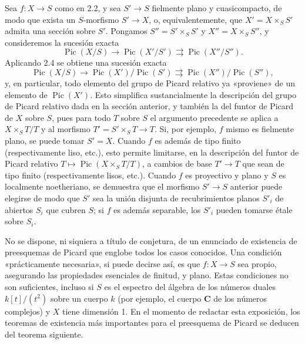  Sea $f:X\longrightarrow S$ como en 2.2, y sea
$S'\longrightarrow S$ fielmente plano y cuasicompacto, de modo que exista un
$S$-morfismo $S'\longrightarrow X$, o, equivalentemente, que
$X'=X\times_SS'$ admita una sección sobre $S'$. Pongamos
$S''=S'\times_SS'$ y $X''=X\times_SS''$, y consideremos la sucesión exacta
\[
\operatorname{Pic}(X/S)\longrightarrow\operatorname{Pic}(X'/S')
\rightrightarrows\operatorname{Pic}(X''/S'').
\]
Aplicando 2.4 se obtiene una sucesión exacta
\[
\operatorname{Pic}(X/S)\longrightarrow
\operatorname{Pic}(X')/\operatorname{Pic}(S')
\rightrightarrows
\operatorname{Pic}(X'')/\operatorname{Pic}(S''),
\]
y, en particular, todo elemento del grupo de Picard relativo ya «proviene»
de un elemento de $\operatorname{Pic}(X')$. Esto simplifica sustancialmente la
descripción del grupo de Picard relativo dada en la sección anterior, y también
la del funtor de Picard de $X$ sobre $S$, pues para todo $T$ sobre $S$ el
argumento precedente se aplica a $X\times_ST/T$ y al morfismo
$T'=S'\times_ST\longrightarrow T$. Si, por ejemplo, $f$ mismo es fielmente
plano, se puede tomar $S'=X$. Cuando $f$ es además de tipo finito
(respectivamente liso, etc.), esto permite limitarse, en la descripción del
funtor de Picard relativo
$T\longmapsto\operatorname{Pic}(X\times_ST/T)$, a cambios de base
$T'\longrightarrow T$ que sean de tipo finito (respectivamente lisos, etc.).
Cuando $f$ es proyectivo y plano y $S$ es localmente noetheriano, se demuestra
que el morfismo $S'\longrightarrow S$ anterior puede elegirse de modo que $S'$
sea la unión disjunta de recubrimientos planos $S'_i$ de abiertos $S_i$ que
cubren $S$; si $f$ es además separable, los $S'_i$ pueden tomarse étale sobre
$S_i$.


No se dispone, ni siquiera a título de conjetura, de un enunciado de existencia
de preesquemas de Picard que englobe todos los casos conocidos. Una condición
«prácticamente necesaria», si puede decirse así, es que
$f:X\longrightarrow S$ sea propio, asegurando las propiedades esenciales de
finitud, y plano. Estas condiciones no son suficientes, incluso si $S$ es el
espectro del álgebra de los números duales $k[t]/(t^2)$ sobre un cuerpo $k$
(por ejemplo, el cuerpo $\mathbf C$ de los números complejos) y $X$ tiene
dimensión 1. En el momento de redactar esta exposición, los teoremas de
existencia más importantes para el preesquema de Picard se deducen del teorema
siguiente.

